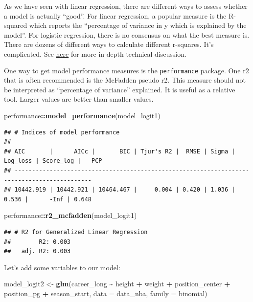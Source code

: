 \documentclass[
]{book}
\newenvironment{Shaded}{\begin{snugshade}}{\end{snugshade}}
\newcommand{\AttributeTok}[1]{\textcolor[rgb]{0.13,0.29,0.53}{#1}}
\newcommand{\FunctionTok}[1]{\textcolor[rgb]{0.13,0.29,0.53}{\textbf{#1}}}
\newcommand{\NormalTok}[1]{#1}
\newcommand{\OtherTok}[1]{\textcolor[rgb]{0.56,0.35,0.01}{#1}}
\newcommand{\SpecialCharTok}[1]{\textcolor[rgb]{0.81,0.36,0.00}{\textbf{#1}}}
\begin{document}
As we have seen with linear regression, there are different ways to assess whether a model is actually ``good''. For linear regression, a popular measure is the R-squared which reports the ``percentage of variance in y which is explained by the model''.
For logistic regression, there is no consensus on what the best measure is. There are dozens of different ways to calculate different r-squares. It's complicated. See \href{https://www.youtube.com/watch?v=xxFYro8QuXA\&ab_channel=StatQuestwithJoshStarmer}{here} for more in-depth technical discussion.

One way to get model performance measures is the \texttt{performance} package. One r2
that is often recommended is the McFadden pseudo r2. This measure should not
be interpreted as ``percentage of variance'' explained. It is useful as a relative
tool. Larger values are better than smaller values.

\begin{Shaded}
\begin{Highlighting}[]
\NormalTok{performance}\SpecialCharTok{::}\FunctionTok{model\_performance}\NormalTok{(model\_logit1)}
\end{Highlighting}
\end{Shaded}

\begin{verbatim}
## # Indices of model performance
## 
## AIC       |      AICc |       BIC | Tjur's R2 |  RMSE | Sigma | Log_loss | Score_log |   PCP
## --------------------------------------------------------------------------------------------
## 10442.919 | 10442.921 | 10464.467 |     0.004 | 0.420 | 1.036 |    0.536 |      -Inf | 0.648
\end{verbatim}

\begin{Shaded}
\begin{Highlighting}[]
\NormalTok{performance}\SpecialCharTok{::}\FunctionTok{r2\_mcfadden}\NormalTok{(model\_logit1)}
\end{Highlighting}
\end{Shaded}

\begin{verbatim}
## # R2 for Generalized Linear Regression
##        R2: 0.003
##   adj. R2: 0.003
\end{verbatim}

Let's add some variables to our model:

\begin{Shaded}
\begin{Highlighting}[]
\NormalTok{model\_logit2 }\OtherTok{\textless{}{-}} \FunctionTok{glm}\NormalTok{(career\_long }\SpecialCharTok{\textasciitilde{}}\NormalTok{ height }\SpecialCharTok{+}\NormalTok{ weight }\SpecialCharTok{+}\NormalTok{ position\_center }\SpecialCharTok{+}\NormalTok{ position\_pg }\SpecialCharTok{+}
\NormalTok{                      season\_start,}
                    \AttributeTok{data =}\NormalTok{ data\_nba,}
                    \AttributeTok{family =}\NormalTok{ binomial)}
\end{Highlighting}
\end{Shaded}
\end{document}

